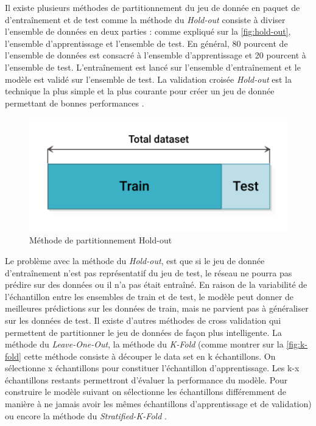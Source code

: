  Il existe plusieurs méthodes de partitionnement du jeu de donnée en paquet de d'entraînement et de test comme la méthode du \textit{Hold-out} consiste à diviser l'ensemble de données en deux parties : comme expliqué sur la \autoref{fig:hold-out}, l'ensemble d'apprentissage et l'ensemble de test. En général, 80 pourcent de l'ensemble de données est consacré à l'ensemble d'apprentissage et 20 pourcent à l'ensemble de test. L'entraînement est lancé sur l'ensemble d'entraînement et le modèle est validé sur l'ensemble de test. La validation croisée \textit{Hold-out} est la technique la plus simple et la plus courante pour créer un jeu de donnée permettant de bonnes performances \cite{noauthor_31_nodate}.
\begin{figure}[ht!]
        \centering
        \includegraphics[width=0.6\linewidth]{Rapport/images/hold-out.png}
        \caption{Méthode de partitionnement Hold-out}
        \label{fig:hold-out}
\end{figure}
Le problème avec la méthode du \textit{Hold-out}, est que si le jeu de donnée d'entraînement n'est pas représentatif du jeu de test, le réseau ne pourra pas prédire sur des données ou il n'a pas était entraîné. En raison de la variabilité de l'échantillon entre les ensembles de train et de test, le modèle peut donner de meilleures prédictions sur les données de train, mais ne parvient pas à généraliser sur les données de test. Il existe d'autres méthodes de cross validation qui permettent de partitionner le jeu de données de façon plus intelligente. La méthode du \textit{Leave-One-Out}, la méthode du \textit{K-Fold} (comme montrer sur la \autoref{fig:k-fold} cette méthode consiste à découper le data set en k échantillons. On sélectionne x échantillons pour constituer l’échantillon d’apprentissage. Les k-x échantillons restants permettront d’évaluer la performance du modèle. Pour construire le modèle suivant on sélectionne les échantillons différemment de manière à ne jamais avoir les mêmes échantillons d’apprentissage et de validation) ou encore la méthode du \textit{Stratified-K-Fold} \cite{noauthor_cross-validation_2020}. 
